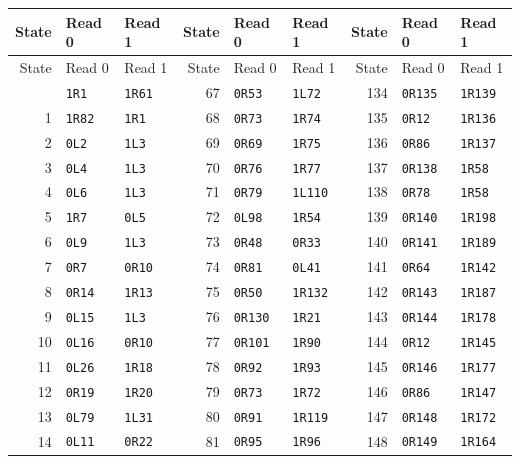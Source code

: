 \begingroup\small
\setlength{\tabcolsep}{8pt}
\begin{longtable}{@{}rllrllrll@{}}
\toprule
State & Read 0 & Read 1 & State & Read 0 & Read 1 & State & Read 0 & Read 1\\
\midrule
\endfirsthead
\toprule
State & Read 0 & Read 1 & State & Read 0 & Read 1 & State & Read 0 & Read 1\\
\midrule
\endhead
\bottomrule
\endfoot
0 & \texttt{1R1} & \texttt{1R61} & 67 & \texttt{0R53} & \texttt{1L72} & 134 & \texttt{0R135} & \texttt{1R139}\\
1 & \texttt{1R82} & \texttt{1R1} & 68 & \texttt{0R73} & \texttt{1R74} & 135 & \texttt{0R12} & \texttt{1R136}\\
2 & \texttt{0L2} & \texttt{1L3} & 69 & \texttt{0R69} & \texttt{1R75} & 136 & \texttt{0R86} & \texttt{1R137}\\
3 & \texttt{0L4} & \texttt{1L3} & 70 & \texttt{0R76} & \texttt{1R77} & 137 & \texttt{0R138} & \texttt{1R58}\\
4 & \texttt{0L6} & \texttt{1L3} & 71 & \texttt{0R79} & \texttt{1L110} & 138 & \texttt{0R78} & \texttt{1R58}\\
5 & \texttt{1R7} & \texttt{0L5} & 72 & \texttt{0L98} & \texttt{1R54} & 139 & \texttt{0R140} & \texttt{1R198}\\
6 & \texttt{0L9} & \texttt{1L3} & 73 & \texttt{0R48} & \texttt{0R33} & 140 & \texttt{0R141} & \texttt{1R189}\\
7 & \texttt{0R7} & \texttt{0R10} & 74 & \texttt{0R81} & \texttt{0L41} & 141 & \texttt{0R64} & \texttt{1R142}\\
8 & \texttt{0R14} & \texttt{1R13} & 75 & \texttt{0R50} & \texttt{1R132} & 142 & \texttt{0R143} & \texttt{1R187}\\
9 & \texttt{0L15} & \texttt{1L3} & 76 & \texttt{0R130} & \texttt{1R21} & 143 & \texttt{0R144} & \texttt{1R178}\\
10 & \texttt{0L16} & \texttt{0R10} & 77 & \texttt{0R101} & \texttt{1R90} & 144 & \texttt{0R12} & \texttt{1R145}\\
11 & \texttt{0L26} & \texttt{1R18} & 78 & \texttt{0R92} & \texttt{1R93} & 145 & \texttt{0R146} & \texttt{1R177}\\
12 & \texttt{0R19} & \texttt{1R20} & 79 & \texttt{0R73} & \texttt{1R72} & 146 & \texttt{0R86} & \texttt{1R147}\\
13 & \texttt{0L79} & \texttt{1L31} & 80 & \texttt{0R91} & \texttt{1R119} & 147 & \texttt{0R148} & \texttt{1R172}\\
14 & \texttt{0L11} & \texttt{0R22} & 81 & \texttt{0R95} & \texttt{1R96} & 148 & \texttt{0R149} & \texttt{1R164}\\

\end{longtable}
